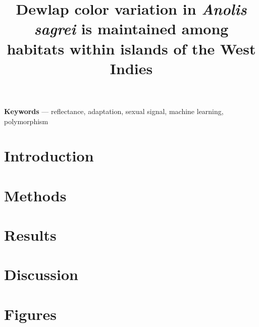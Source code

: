 \documentclass{article}
\title{Dewlap color variation in \textit{Anolis sagrei} is maintained among habitats within islands of the West Indies}
\date{}
\begin{document}
	
	\linenumbers
	
	\maketitle
	
	\begin{abstract}
		
	\end{abstract}
	
	\textbf{Keywords} --- reflectance, adaptation, sexual signal, machine learning, polymorphism
	
	\pagebreak
	
	\section*{Introduction}
	
	
	
	\pagebreak
	
	\section*{Methods}
	
	
	
	\pagebreak
	
	\section*{Results}
	
	
	
	\pagebreak
	
	\section*{Discussion}
	
	
	
	\pagebreak
	
	
	
	
	\pagebreak
	
	\section*{Figures}
	
	\pagebreak
	
	
	
	\pagebreak
	
\end{document}
